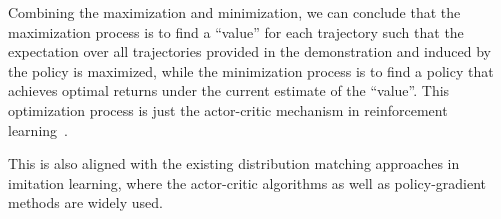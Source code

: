 % 
% 
% 

Combining the maximization and minimization,
we can conclude that the maximization process is to find a ``value'' for each trajectory such that the expectation over all trajectories provided in the demonstration and induced by the policy is maximized, 
while the minimization process is to find a policy that achieves optimal returns under the current estimate of the ``value''. 
This optimization process is just the actor-critic mechanism in reinforcement learning~\citep{konda2000actor}. 


This is also aligned with the existing distribution matching approaches in imitation learning, where the actor-critic algorithms as well as policy-gradient methods are widely used. 

